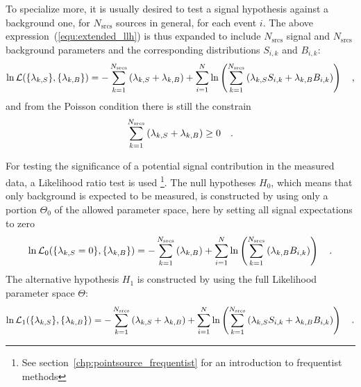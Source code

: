 To specialize more, it is usually desired to test a signal hypothesis against a background one, for $N_\text{srcs}$ sources in general, for each event $i$.
The above expression~(\ref{equ:extended_llh}) is thus expanded to include $N_\text{srcs}$ signal and $N_\text{srcs}$ background parameters and the corresponding distributions $S_{i,k}$ and $B_{i,k}$:
\begin{equation}
  \ln\mathcal{L}(\{\lambda_{k,S}\}, \{\lambda_{k,B}\})
  = -\sum_{k=1}^{N_\text{srcs}}\left(\lambda_{k,S}+\lambda_{k,B}\right) +
    \sum_{i=1}^N \ln\left(\sum_{k=1}^{N_\text{srcs}}\left(
      \lambda_{k,S} S_{i,k}+\lambda_{k,B} B_{i,k}\right)\right)
  \quad\text{,}
\end{equation}
and from the Poisson condition there is still the constrain
\begin{equation}
  \sum_{k=1}^{N_\text{srcs}}\left(\lambda_{k,S}+\lambda_{k,B}\right) \geq 0
  \quad\text{.}
\end{equation}

For testing the significance of a potential signal contribution in the measured data, a Likelihood ratio test is used \footnote{See section~\ref{chp:pointsource_frequentist} for an introduction to frequentist methods}.
The null hypotheses $H_0$, which means that only background is expected to be measured, is constructed by using only a portion $\Theta_0$ of the allowed parameter space, here by setting all signal expectations to zero
\begin{equation}
  \ln\mathcal{L}_0(\{\lambda_{k,S}=0\}, \{\lambda_{k,B}\})
  = -\sum_{k=1}^{N_\text{srcs}}\left(\lambda_{k,B}\right) +
    \sum_{i=1}^N \ln\left(\sum_{k=1}^{N_\text{srcs}}\left(
      \lambda_{k,B} B_{i,k}\right)\right)
  \quad\text{.}
\end{equation}
The alternative hypothesis $H_1$ is constructed by using the full Likelihood parameter space $\Theta$:
\begin{equation}
  \ln\mathcal{L}_1(\{\lambda_{k,S}\}, \{\lambda_{k,B}\})
  = -\sum_{k=1}^{N_\text{srcs}}\left(\lambda_{k,S}+
                                     \lambda_{k,B}\right) +
    \sum_{i=1}^N \ln\left(\sum_{k=1}^{N_\text{srcs}}\left(
      \lambda_{k,S} S_{i,k}+\lambda_{k,B} B_{i,k}\right)\right)
  \quad\text{.}
\end{equation}

